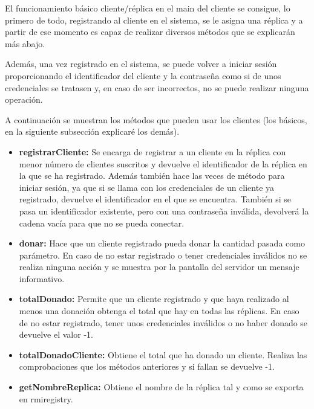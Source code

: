 \documentclass{article}
\begin{document}
\bigskip

El funcionamiento básico cliente/réplica en el main del cliente se consigue, lo primero de todo, registrando al cliente en el sistema, se le asigna una réplica y a partir de ese momento es capaz de realizar diversos métodos que se explicarán más abajo.

\bigskip

Además, una vez registrado en el sistema, se puede volver a iniciar sesión proporcionando el identificador del cliente y la contraseña como si de unos credenciales se tratasen y, en caso de ser incorrectos, no se puede realizar ninguna operación.

\bigskip

A continuación se muestran los métodos que pueden usar los clientes (los básicos, en la siguiente subsección explicaré los demás).

\begin{itemize}
    \item \textbf{registrarCliente: }Se encarga de registrar a un cliente en la réplica con menor número de clientes suscritos y devuelve el identificador de la réplica en la que se ha registrado. Además también hace las veces de método para iniciar sesión, ya que si se llama con los credenciales de un cliente ya registrado, devuelve el identificador en el que se encuentra. También si se pasa un identificador existente, pero con una contraseña inválida, devolverá la cadena vacía para que no se pueda conectar.
    
    \item \textbf{donar: }Hace que un cliente registrado pueda donar la cantidad pasada como parámetro. En caso de no estar registrado o tener credenciales inválidos no se realiza ninguna acción y se muestra por la pantalla del servidor un mensaje informativo.

    \item \textbf{totalDonado: }Permite que un cliente registrado y que haya realizado al menos una donación obtenga el total que hay en todas las réplicas. En caso de no estar registrado, tener unos credenciales inválidos o no haber donado se devuelve el valor -1.
    
    \item \textbf{totalDonadoCliente: }Obtiene el total que ha donado un cliente. Realiza las comprobaciones que los métodos anteriores y si fallan se devuelve -1.
    
    \item \textbf{getNombreReplica: }Obtiene el nombre de la réplica tal y como se exporta en rmiregistry.
\end{itemize}
\end{document}
